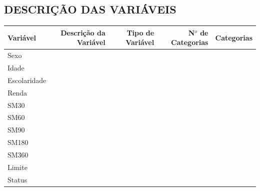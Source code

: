 \documentclass[
	12pt,				%
	openright,			%
	oneside,      %
	a4paper,			%
	english,			%
	french,				%
	spanish,			%
	brazil,				%
	]{abntex2}\usepackage[]{graphicx}\usepackage[]{xcolor}
\begin{document}


%
%



\begin{apendicesenv}

\partapendices

\chapter{DESCRIÇÃO DAS VARIÁVEIS}
\begin{center}
  \begin{tabular}{l r r r r}
    \toprule
    Variável      & Descrição da Variável & Tipo de Variável & N$^{o}$ de Categorias & Categorias\\
    \hline
    Sexo          &         &         &       &       \\
    \hline
    Idade         &         &         &       &       \\
    \hline
    Escolaridade  &         &         &       &       \\
    \hline
    Renda         &         &         &       &       \\
    \hline
    SM30          &         &         &       &       \\
    \hline
    SM60          &         &         &       &       \\
    \hline
    SM90          &         &         &       &       \\
    \hline
    SM180          &         &         &       &       \\
    \hline
    SM360          &         &         &       &       \\
    \hline
    Limite          &         &         &       &       \\
    \hline
    Status          &         &         &       &       \\
    \bottomrule
  \end{tabular}
\end{center}


\end{apendicesenv}
\end{document}
